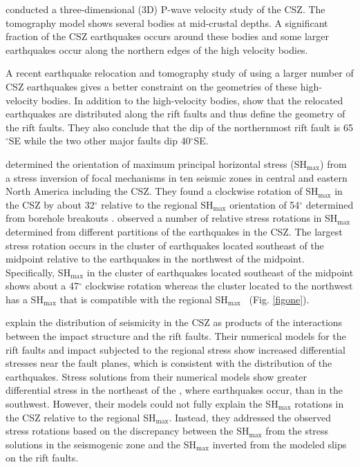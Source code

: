 \documentclass[draft]{agujournal2018}
\begin{document}
\citet{Vlahovic_2003} conducted a three-dimensional (3D) P-wave velocity study of the CSZ. The tomography model shows several  bodies at mid-crustal depths. A significant fraction of the CSZ earthquakes occurs around these  bodies and some larger earthquakes occur along the northern edges of the high velocity bodies. 

A recent earthquake relocation and tomography study of \citet{Powell_2017} using a larger number of CSZ earthquakes gives a better constraint on the geometries of these high-velocity bodies. In addition to the high-velocity bodies, \citet{Powell_2017} show that the relocated earthquakes are distributed along the rift faults and thus define the geometry of the rift faults. They also conclude that the dip of the northernmost rift fault is 65$^\circ$SE while the two other major faults dip 40$^\circ$SE. 

\citet{Mazzotti_2010} determined the orientation of maximum principal horizontal stress (SH$_{\max}$) from a stress inversion of focal mechanisms in ten seismic zones in central and eastern North America including the CSZ. They found a clockwise rotation of SH$_{\max}$ in the CSZ by about 32$^\circ$ relative to the regional SH$_{\max}$ orientation of 54$^\circ$ determined from borehole breakouts \citep{Zoback_1992,Mazzotti_2010}. \citet{Mazzotti_2010} observed a number of relative stress rotations in SH$_{\max}$ determined from different partitions of the earthquakes in the CSZ. The largest stress rotation occurs in the cluster of earthquakes located southeast of the  midpoint relative to the earthquakes in the northwest of the  midpoint. Specifically, SH$_{\max}$ in the cluster of earthquakes located southeast of the  midpoint shows about a 47$^\circ$ clockwise rotation whereas the cluster located to the northwest has a SH$_{\max}$ that is compatible with the regional SH$_{\max}$~\citep{Mazzotti_2010} (Fig. \ref{figone}).

\citet{Baird_2010} explain the distribution of seismicity in the CSZ as products of the interactions between the impact structure and the rift faults. Their numerical models for the rift faults and impact  subjected to the regional stress show increased differential stresses near the fault planes, which is consistent with the distribution of the earthquakes. Stress solutions from their numerical models show greater differential stress in the northeast of the , where  earthquakes occur, than in the southwest. However, their models could not fully explain the SH$_{\max}$ rotations in the CSZ relative to the regional SH$_{\max}$. Instead, they addressed the observed stress rotations based on the discrepancy between the SH$_{\max}$ from the stress solutions in the seismogenic zone and the SH$_{\max}$ inverted from the modeled slips on the rift faults.
\end{document}
